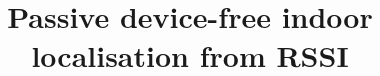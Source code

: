 \documentclass{sig-alternate-ipsn13}
\begin{document}
\title{Passive device-free indoor localisation from RSSI}
%
%
%
%
%

%
%
% 
\end{document}
